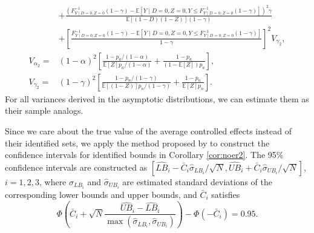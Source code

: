\documentclass[12pt]{article}
\theoremstyle{plain}
\theoremstyle{definition}
\theoremstyle{remark}
\begin{document}
\begin{equation*}
\begin{aligned}
        &+ \frac{(F^{-1}_{Y \mid D = 0, Z = 0}(1 - \gamma) - \mathbb{E}[Y \mid D = 0, Z = 0, Y \leq F^{-1}_{Y \mid D = 0, Z = 0} (1 - \gamma)])^2 \gamma}{\mathbb{E}[(1 - D)(1 - Z)] (1 - \gamma)} \\
        &+ \left[\frac{F^{-1}_{Y \mid D = 0, Z = 0}(1 - \gamma) - \mathbb{E}[Y \mid D = 0, Z = 0, Y \leq F^{-1}_{Y \mid D = 0, Z = 0} (1 - \gamma)]}{1 - \gamma}\right]^2 V_{\gamma_2}, \\
        V_{\alpha_2} =& (1 - \alpha)^2 \left[\frac{1 - p_a / (1 - \alpha)}{\mathbb{E}[Z] p_a / (1 - \alpha)} + \frac{1 - p_a}{(1 - \mathbb{E}[Z]) p_a}\right], \\
        V_{\gamma_2} =& (1 - \gamma)^2 \left[\frac{1 - p_n / (1 - \gamma)}{\mathbb{E}[(1 - Z)] p_n / (1 - \gamma)} + \frac{1 - p_n}{\mathbb{E}[Z] p_n}\right]. 
    \end{aligned}
\end{equation*}
For all variances derived in the asymptotic distributions, we can estimate them as their sample analogs.

Since we care about the true value of the average controlled effects instead of their identified sets, we apply the method proposed by \cite{imbens2004confidence} to construct the confidence intervals for identified bounds in Corollary \ref{cor:noer2}. The 95\% confidence intervals are constructed as $[\widehat{LB}_i - \bar{C}_i \hat{\sigma}_{LB_i} / \sqrt{N}, \widehat{UB}_i + \bar{C}_i \hat{\sigma}_{UB_i} / \sqrt{N}]$, $i = 1, 2, 3$, where $\hat{\sigma}_{LB_i}$ and $\hat{\sigma}_{UB_i}$ are estimated standard deviations of the corresponding lower bounds and upper bounds, and $\bar{C}_i$ satisfies 
\begin{equation*}
    \Phi\left(\bar{C}_i +\sqrt{N} \frac{\widehat{UB}_i - \widehat{LB}_i}{\max \left(\hat{\sigma}_{LB_i}, \hat{\sigma}_{UB_i}\right)}\right) - \Phi\left(-\bar{C}_i\right)=0.95.
\end{equation*}
\end{document}
